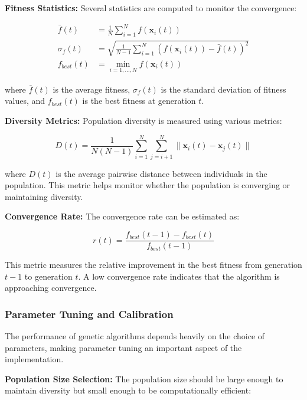 \documentclass[12pt,a4paper]{article}
\begin{document}
\textbf{Fitness Statistics:} Several statistics are computed to monitor the convergence:

\begin{equation}\label{Eq.fitness_statistics}
\begin{aligned}
\bar{f}(t) &= \frac{1}{N} \sum_{i=1}^{N} f(\mathbf{x}_i(t)) \\
\sigma_f(t) &= \sqrt{\frac{1}{N-1} \sum_{i=1}^{N} (f(\mathbf{x}_i(t)) - \bar{f}(t))^2} \\
f_{best}(t) &= \min_{i=1,\ldots,N} f(\mathbf{x}_i(t))
\end{aligned}
\end{equation}

where $\bar{f}(t)$ is the average fitness, $\sigma_f(t)$ is the standard deviation of fitness values, and $f_{best}(t)$ is the best fitness at generation $t$.

\textbf{Diversity Metrics:} Population diversity is measured using various metrics:

\begin{equation}\label{Eq.diversity_metrics}
D(t) = \frac{1}{N(N-1)} \sum_{i=1}^{N} \sum_{j=i+1}^{N} \|\mathbf{x}_i(t) - \mathbf{x}_j(t)\|
\end{equation}

where $D(t)$ is the average pairwise distance between individuals in the population. This metric helps monitor whether the population is converging or maintaining diversity.

\textbf{Convergence Rate:} The convergence rate can be estimated as:

\begin{equation}\label{Eq.convergence_rate}
r(t) = \frac{f_{best}(t-1) - f_{best}(t)}{f_{best}(t-1)}
\end{equation}

This metric measures the relative improvement in the best fitness from generation $t-1$ to generation $t$. A low convergence rate indicates that the algorithm is approaching convergence.

\subsubsection{Parameter Tuning and Calibration}

The performance of genetic algorithms depends heavily on the choice of parameters, making parameter tuning an important aspect of the implementation.

\textbf{Population Size Selection:} The population size should be large enough to maintain diversity but small enough to be computationally efficient:
\end{document}
